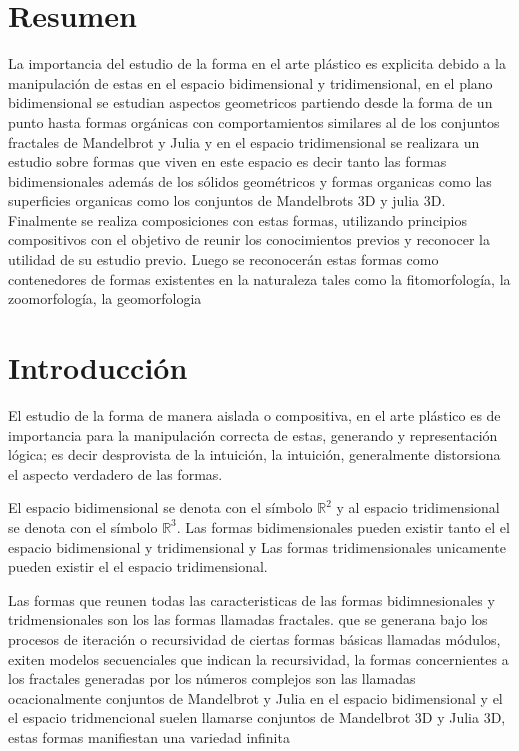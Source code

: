 \documentclass[
  16pt,
]{krantz}
\theoremstyle{definition}
\theoremstyle{definition}
\theoremstyle{definition}
\theoremstyle{definition}
\theoremstyle{remark}
\begin{document}
\hypertarget{resumen}{%
\chapter*{Resumen}\label{resumen}}


La importancia del estudio de la forma en el arte plástico es explicita debido a la manipulación de estas en el espacio bidimensional y tridimensional, en el plano bidimensional se estudian aspectos geometricos partiendo desde la forma de un punto hasta formas orgánicas con comportamientos similares al de los conjuntos fractales de Mandelbrot y Julia y en el espacio tridimensional se realizara un estudio sobre formas que viven en este espacio es decir tanto las formas bidimensionales además de los sólidos geométricos y formas organicas como las superficies organicas como los conjuntos de Mandelbrots 3D y julia 3D. Finalmente se realiza composiciones con estas formas, utilizando principios compositivos con el objetivo de reunir los conocimientos previos y reconocer la utilidad de su estudio previo. Luego se reconocerán estas formas como contenedores de formas existentes en la naturaleza tales como la fitomorfología, la zoomorfología, la geomorfologia

\hypertarget{introducciuxf3n}{%
\chapter*{Introducción}\label{introducciuxf3n}}


El estudio de la forma de manera aislada o compositiva, en el arte plástico es de importancia para la manipulación correcta de estas, generando y representación lógica; es decir desprovista de la intuición, la intuición, generalmente distorsiona el aspecto verdadero de las formas.

El espacio bidimensional se denota con el símbolo \(\mathbb{R}^2\) y al espacio tridimensional se denota con el símbolo \(\mathbb{R}^3\). Las formas bidimensionales pueden existir tanto el el espacio bidimensional y tridimensional y Las formas tridimensionales unicamente pueden existir el el espacio tridimensional.

Las formas que reunen todas las caracteristicas de las formas bidimnesionales y tridmensionales son los las formas llamadas fractales. que se generana bajo los procesos de iteración o recursividad de ciertas formas básicas llamadas módulos, exiten modelos secuenciales que indican la recursividad, la formas concernientes a los fractales generadas por los números complejos son las llamadas ocacionalmente conjuntos de Mandelbrot y Julia en el espacio bidimensional y el el espacio tridmencional suelen llamarse conjuntos de Mandelbrot 3D y Julia 3D, estas formas manifiestan una variedad infinita
\end{document}
